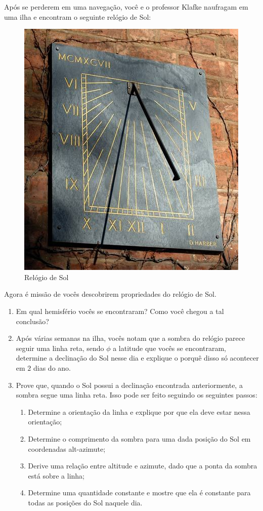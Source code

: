 \documentclass[11pt]{article}
\begin{document}
\begin{pproblem} Após se perderem em uma navegação, você e o professor Klafke naufragam em uma ilha e encontram o seguinte relógio de Sol:
    \begin{figure}[H]
        \centering
        \includegraphics[width=0.5\linewidth]{imagens/q6.jpg}
        \caption{Relógio de Sol}
    \end{figure}
    Agora é missão de vocês descobrirem propriedades do relógio de Sol.
    \begin{enumerate}[label=\textbf{\alph*)}]
        \item Em qual hemisfério vocês se encontraram? Como você chegou a tal conclusão?
        \item Após várias semanas na ilha, vocês notam que a sombra do relógio parece seguir uma linha reta, sendo \(\phi\) a latitude que vocês se encontraram, determine a declinação do Sol nesse dia e explique o porquê disso só acontecer em \(2\) dias do ano.
        \item Prove que, quando o Sol possui a declinação encontrada anteriormente, a sombra segue uma linha reta. Isso pode ser feito seguindo os seguintes passos:
        \begin{enumerate}[label=\roman*)]
            \item Determine a orientação da linha e explique por que ela deve estar nessa orientação;
            \item Determine o comprimento da sombra para uma dada posição do Sol em coordenadas alt-azimute;
            \item Derive uma relação entre altitude e azimute, dado que a ponta da sombra está sobre a linha;
            \item Determine uma quantidade constante e mostre que ela é constante para todas as posições do Sol naquele dia.
        \end{enumerate}
    \end{enumerate}



\end{pproblem}
\end{document}
